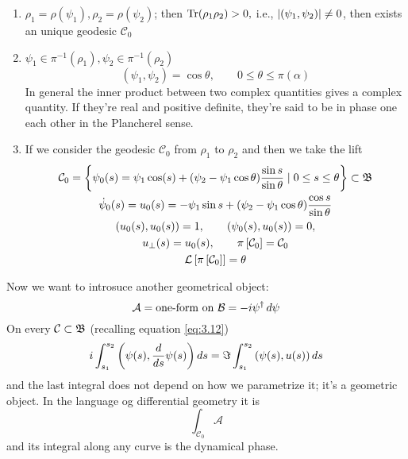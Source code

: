 \begin{enumerate}[i]
	\item $ \rho_1=\rho(\psi_1),\rho_2=\rho(\psi_2) $; then $ \mathrm{Tr}(\rho_1\rho_2)>0, $ i.e., $ \lvert\left(\psi_1,\psi_2\right)\rvert\neq 0 $, then exists an unique geodesic $ \mathcal{C}_0 $
	\item $ \psi_1\in\pi^{-1}(\rho_1), \psi_2\in\pi^{-1}(\rho_2) $
	\begin{equation}
	\left(\psi_1,\psi_2 \right)=\cos\theta, \qquad 0\leq \theta\leq\pi(\alpha)
	\end{equation}
	In general the inner product between two complex quantities gives a complex quantity. If they're real and positive definite, they're said to be in phase one each other in the Plancherel sense.
	\item If we consider the geodesic $ \mathcal{C}_0 $ from $ \rho_1 $ to $ \rho_2 $ and then we take the lift
	\begin{gather}
	\mathcal{C}_0=\left\{\psi_0(s)=\psi_1\cos(s)+(\psi_2-\psi_1\cos\theta)\frac{\sin s}{\sin\theta}\mid 0\leq s\leq\theta \right\}\subset\mathfrak{B}\\
	\dot{\psi}_0(s)=u_0(s)=-\psi_1\sin s+(\psi_2-\psi_1\cos\theta)\dfrac{\cos s}{\sin \theta}\\
	(u_0(s),u_0(s))=1, \qquad (\psi_0(s),u_0(s))=0,\\
	u_{\perp}(s)=u_0(s),\qquad \pi\left[\mathcal{C}_0 \right]=\mathcal{C}_0\\
	\mathcal{L}\left[\pi\left[\mathcal{C}_0 \right] \right]=\theta
	\end{gather}
\end{enumerate}

Now we want to introsuce another geometrical object: 
\begin{equation}
\mathcal{A}=\text{one-form on $ \mathcal{B} $} = -i\psi^{\dagger}\mathop{}\!d \psi
\end{equation}
On every $ \mathcal{C}\subset\mathfrak{B} $ (recalling equation \eqref{eq:3.12})
\begin{equation}
\-i\int_{s_1}^{s_2}\left(\psi(s),\frac{d}{ds}\psi(s)\right)\mathop{}\!d s=\Im\int_{s_1}^{s_2}\left(\psi(s),u(s)\right)\mathop{}\!d s
\end{equation}
and the last integral does not depend on how we parametrize it; it's a geometric object.
In the language og differential geometry it is 
\begin{equation}
\int_{\mathcal{C}_0}\mathcal{A}
\end{equation}
and its integral along any curve is the dynamical phase.

